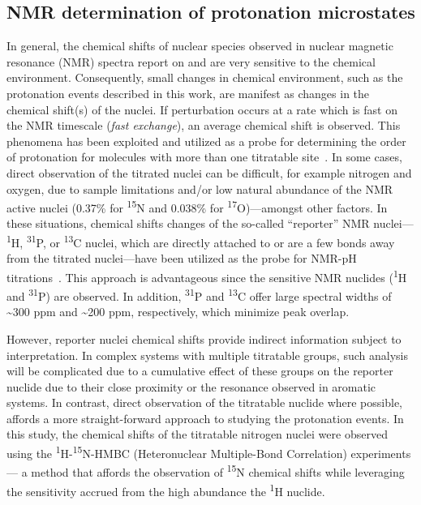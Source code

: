 \documentclass[9pt,lineno]{elife}
\begin{document}
\subsection{NMR determination of protonation microstates}
In general, the chemical shifts of nuclear species observed in nuclear magnetic resonance (NMR) spectra report on and are very sensitive to the chemical environment. 
Consequently, small changes in chemical environment, such as the protonation events described in this work, are manifest as changes in the chemical shift(s) of the nuclei. 
If perturbation occurs at a rate which is fast on the NMR timescale (\emph{fast exchange}), an average chemical shift is observed. 
This phenomena has been exploited and utilized as a probe for determining the order of protonation for molecules with more than one titratable site~\citep{NMR1_szakacs_acidbase_2005}.
In some cases, direct observation of the titrated nuclei can be difficult, for example nitrogen and oxygen, due to sample limitations and/or low natural abundance of the NMR active nuclei (0.37\% for \textsuperscript{15}N and 0.038\% for \textsuperscript{17}O)---amongst other factors. 
In these situations, chemical shifts changes of the so-called “reporter” NMR nuclei---\textsuperscript{1}H, \textsuperscript{31}P, or \textsuperscript{13}C nuclei, which are directly attached to or are a few bonds away from the titrated nuclei---have been utilized as the probe for NMR-pH titrations~\citep{NMR2_szakcs_determination_2004, NMR3_dozol_inframolecular_2002, bezencon_pka_2014}.
This approach is advantageous since the sensitive NMR nuclides (\textsuperscript{1}H and \textsuperscript{31}P) are observed. 
In addition, \textsuperscript{31}P and \textsuperscript{13}C offer large spectral widths of \textasciitilde300 ppm and \textasciitilde200 ppm, respectively, which minimize peak overlap. 

However, reporter nuclei chemical shifts provide indirect information subject to interpretation. 
In complex systems with multiple titratable groups, such analysis will be complicated due to a cumulative effect of these groups on the reporter nuclide due to their close proximity or the resonance observed in aromatic systems.
In contrast, direct observation of the titratable nuclide where possible, affords a more straight-forward approach to studying the protonation events.
In this study, the chemical shifts of the titratable nitrogen nuclei were observed using the \textsuperscript{1}H-\textsuperscript{15}N-HMBC (Heteronuclear Multiple-Bond Correlation) experiments --- a method that affords the observation of \textsuperscript{15}N chemical shifts while leveraging the sensitivity accrued from the high abundance the \textsuperscript{1}H nuclide.
\end{document}
